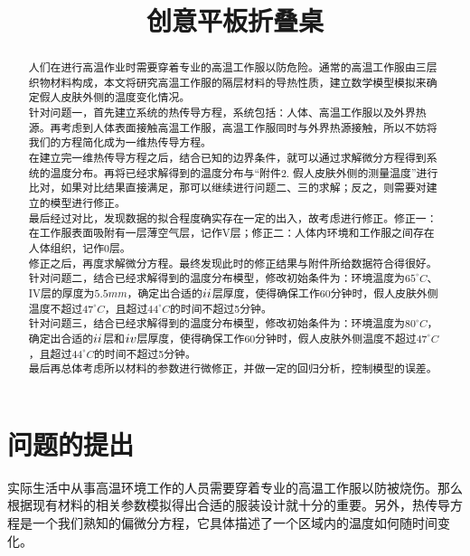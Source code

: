 \documentclass[bwprint]{cumcmthesis}
\title{创意平板折叠桌}
\begin{document}
 \maketitle
 \begin{abstract}
    \indent 人们在进行高温作业时需要穿着专业的高温工作服以防危险。通常的高温工作服由三层织物材料构成，本文将研究高温工作服的隔层材料的导热性质，建立数学模型模拟来确定假人皮肤外侧的温度变化情况。\\
    \indent 针对问题一，首先建立系统的热传导方程，系统包括：人体、高温工作服以及外界热源。再考虑到人体表面接触高温工作服，高温工作服同时与外界热源接触，所以不妨将我们的方程简化成为一维热传导方程。\\
    \indent 在建立完一维热传导方程之后，结合已知的边界条件，就可以通过求解微分方程得到系统的温度分布。再将已经求解得到的温度分布与“附件2. 假人皮肤外侧的测量温度”进行比对，如果对比结果直接满足，那可以继续进行问题二、三的求解；反之，则需要对建立的模型进行修正。\\
    \indent 最后经过对比，发现数据的拟合程度确实存在一定的出入，故考虑进行修正。修正一：在工作服表面吸附有一层薄空气层，记作V层；修正二：人体内环境和工作服之间存在人体组织，记作0层。\\
    \indent 修正之后，再度求解微分方程。最终发现此时的修正结果与附件所给数据符合得很好。\\
    \indent 针对问题二，结合已经求解得到的温度分布模型，修改初始条件为：环境温度为$65^{\circ}C$、IV层的厚度为$5.5mm$，确定出合适的$\uppercase\expandafter{\romannumeral2}$层厚度，使得确保工作60分钟时，假人皮肤外侧温度不超过$47^{\circ}C$，且超过$44^{\circ}C$的时间不超过5分钟。\\
    \indent 针对问题三，结合已经求解得到的温度分布模型，修改初始条件为：环境温度为$80^{\circ}C$，确定出合适的$\uppercase\expandafter{\romannumeral2}$层和$\uppercase\expandafter{\romannumeral4}$层厚度，使得确保工作60分钟时，假人皮肤外侧温度不超过$47^{\circ}C$，且超过$44^{\circ}C$的时间不超过5分钟。\\
    \indent 最后再总体考虑所以材料的参数进行微修正，并做一定的回归分析，控制模型的误差。
\end{abstract}

\section{问题的提出}
    \indent 实际生活中从事高温环境工作的人员需要穿着专业的高温工作服以防被烧伤。那么根据现有材料的相关参数模拟得出合适的服装设计就十分的重要。另外，热传导方程是一个我们熟知的偏微分方程，它具体描述了一个区域内的温度如何随时间变化。\\
\end{document}
